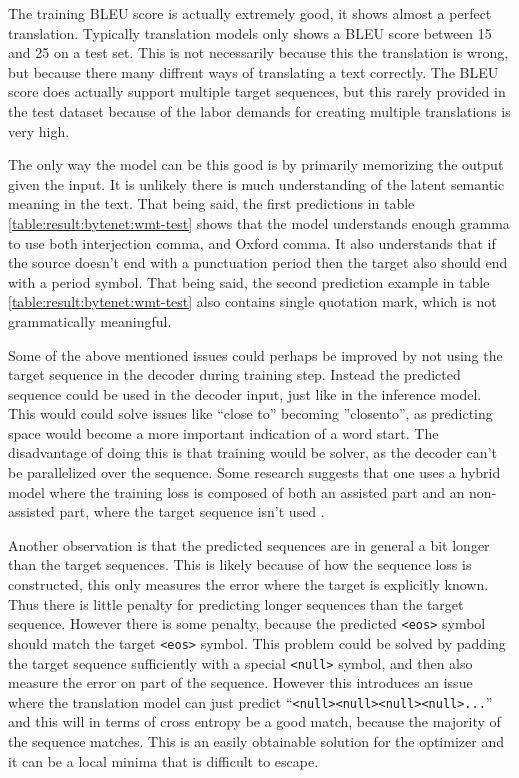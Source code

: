 The training BLEU score is actually extremely good, it shows almost a perfect translation. Typically translation models only shows a BLEU score between 15 and 25 on a test set. This is not necessarily because this the translation is wrong, but because there many diffrent ways of translating a text correctly. The BLEU score does actually support multiple target sequences, but this rarely provided in the test dataset because of the labor demands for creating multiple translations is very high.

The only way the model can be this good is by primarily memorizing the output given the input. It is unlikely there is much understanding of the latent semantic meaning in the text. That being said, the first predictions in table \ref{table:result:bytenet:wmt-test} shows that the model understands enough gramma to use both interjection comma, and Oxford comma. It also understands that if the source doesn't end with a punctuation period then the target also should end with a period symbol. That being said, the second prediction example in table \ref{table:result:bytenet:wmt-test} also contains single quotation mark, which is not grammatically meaningful. 

Some of the above mentioned issues could perhaps be improved by not using the target sequence in the decoder during training step. Instead the predicted sequence could be used in the decoder input, just like in the inference model. This would could solve issues like ``close to'' becoming ''closento'', as predicting space would become a more important indication of a word start. The disadvantage of doing this is that training would be solver, as the decoder can't be parallelized over the sequence. Some research suggests that one uses a hybrid model where the training loss is composed of both an assisted part and an non-assisted part, where the target sequence isn't used \cite{no-assist-train}.

Another observation is that the predicted sequences are in general a bit longer than the target sequences. This is likely because of how the sequence loss is constructed, this only measures the error where the target is explicitly known. Thus there is little penalty for predicting longer sequences than the target sequence. However there is some penalty, because the predicted \texttt{<eos>} symbol should match the target \texttt{<eos>} symbol. This problem could be solved by padding the target sequence sufficiently with a special \texttt{<null>} symbol, and then also measure the error on part of the sequence. However this introduces an issue where the translation model can just predict ``\texttt{<null><null><null><null>...}'' and this will in terms of cross entropy be a good match, because the majority of the sequence matches. This is an easily obtainable solution for the optimizer and it can be a local minima that is difficult to escape.

